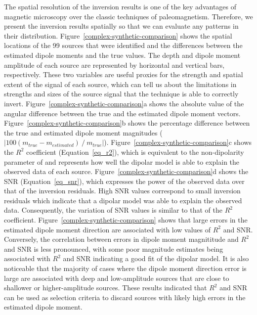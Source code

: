 The spatial resolution of the inversion results is one of the key advantages of magnetic microscopy over the classic techniques of paleomagnetism.
Therefore, we present the inversion results spatially so that we can evaluate any patterns in their distribution.
Figure~\ref{complex-synthetic-comparison} shows the spatial locations of the 99 sources that were identified and the differences between the estimated dipole moments and the true values.
The depth and dipole moment amplitude of each source are represented by horizontal and vertical bars, respectively.
These two variables are useful proxies for the strength and spatial extent of the signal of each source,
which can tell us about the limitations in strengths and sizes of the source signal that the technique is able to correctly invert.
Figure~\ref{complex-synthetic-comparison}a shows the absolute value of the angular difference between the true and the estimated dipole moment vectors.
Figure~\ref{complex-synthetic-comparison}b shows the percentage difference between the true and estimated dipole moment magnitudes ($|100 \left( m_{true} - m_{estimated}\right) ~/~ m_{true}|$).
Figure~\ref{complex-synthetic-comparison}c shows the $R^2$ coefficient (Equation~\ref{eq_r2}), which is equivalent to the non-dipolarity parameter of \citet{Fu2020} and represents how well the dipolar model is able to explain the observed data of each source.
Figure~\ref{complex-synthetic-comparison}d shows the SNR (Equation~\ref{eq_snr}), which expresses the power of the observed data over that of the inversion residuals.
High SNR values correspond to small inversion residuals which indicate that a dipolar model was able to explain the observed data.
Consequently, the variation of SNR values is similar to that of the $R^2$ coefficient.
Figure~\ref{complex-synthetic-comparison} shows that large errors in the estimated dipole moment direction are associated with low values of $R^2$ and SNR.
Conversely, the correlation between errors in dipole moment magnititude and $R^2$ and SNR is less pronounced, with some poor magnitude estimates being associated with $R^2$ and SNR indicating a good fit of the dipolar model.
It is also noticeable that the majority of cases where the dipole moment direction error is large are associated with deep and low-amplitude sources that are close to shallower or higher-amplitude sources.
These results indicated that $R^2$ and SNR can be used as selection criteria to discard sources with likely high errors in the estimated dipole moment.

